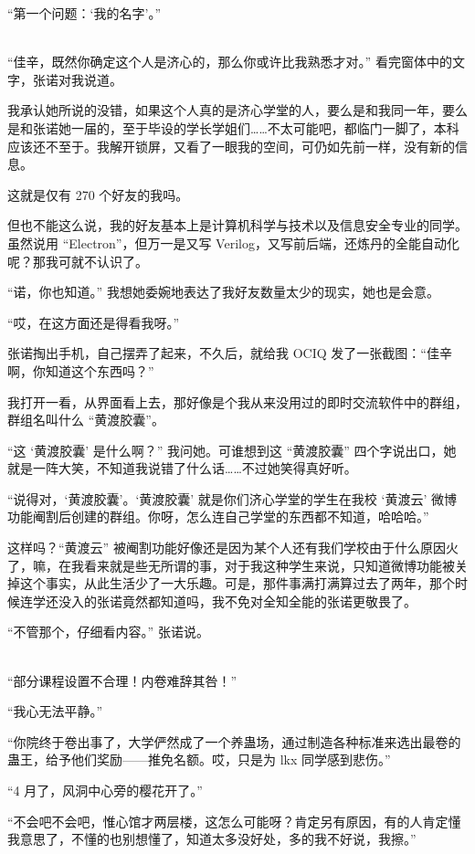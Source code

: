 \documentclass[UTF8]{ctexart}
\begin{document}
“第一个问题：‘我的名字’。”

~\\

“佳辛，既然你确定这个人是济心的，那么你或许比我熟悉才对。” 看完窗体中的文字，张诺对我说道。

我承认她所说的没错，如果这个人真的是济心学堂的人，要么是和我同一年，要么是和张诺她一届的，至于毕设的学长学姐们……不太可能吧，都临门一脚了，本科应该还不至于。我解开锁屏，又看了一眼我的空间，可仍如先前一样，没有新的信息。

这就是仅有 270 个好友的我吗。

但也不能这么说，我的好友基本上是计算机科学与技术以及信息安全专业的同学。虽然说用 “Electron”，但万一是又写 Verilog，又写前后端，还炼丹的全能自动化呢？那我可就不认识了。

“诺，你也知道。” 我想她委婉地表达了我好友数量太少的现实，她也是会意。

“哎，在这方面还是得看我呀。”

张诺掏出手机，自己摆弄了起来，不久后，就给我 OCIQ 发了一张截图：“佳辛啊，你知道这个东西吗？”

我打开一看，从界面看上去，那好像是个我从来没用过的即时交流软件中的群组，群组名叫什么 “黄渡胶囊”。

“这 ‘黄渡胶囊’ 是什么啊？” 我问她。可谁想到这 “黄渡胶囊” 四个字说出口，她就是一阵大笑，不知道我说错了什么话……不过她笑得真好听。

“说得对，‘黄渡胶囊’。‘黄渡胶囊’ 就是你们济心学堂的学生在我校 ‘黄渡云’ 微博功能阉割后创建的群组。你呀，怎么连自己学堂的东西都不知道，哈哈哈。”

这样吗？“黄渡云” 被阉割功能好像还是因为某个人还有我们学校由于什么原因火了，嘛，在我看来就是些无所谓的事，对于我这种学生来说，只知道微博功能被关掉这个事实，从此生活少了一大乐趣。可是，那件事满打满算过去了两年，那个时候连学还没入的张诺竟然都知道吗，我不免对全知全能的张诺更敬畏了。

“不管那个，仔细看内容。” 张诺说。

~\\

“部分课程设置不合理！内卷难辞其咎！”

“我心无法平静。”

“你院终于卷出事了，大学俨然成了一个养蛊场，通过制造各种标准来选出最卷的蛊王，给予他们奖励——推免名额。哎，只是为 lkx 同学感到悲伤。”

“4 月了，风洞中心旁的樱花开了。”

“不会吧不会吧，惟心馆才两层楼，这怎么可能呀？肯定另有原因，有的人肯定懂我意思了，不懂的也别想懂了，知道太多没好处，多的我不好说，我擦。”
\end{document}
